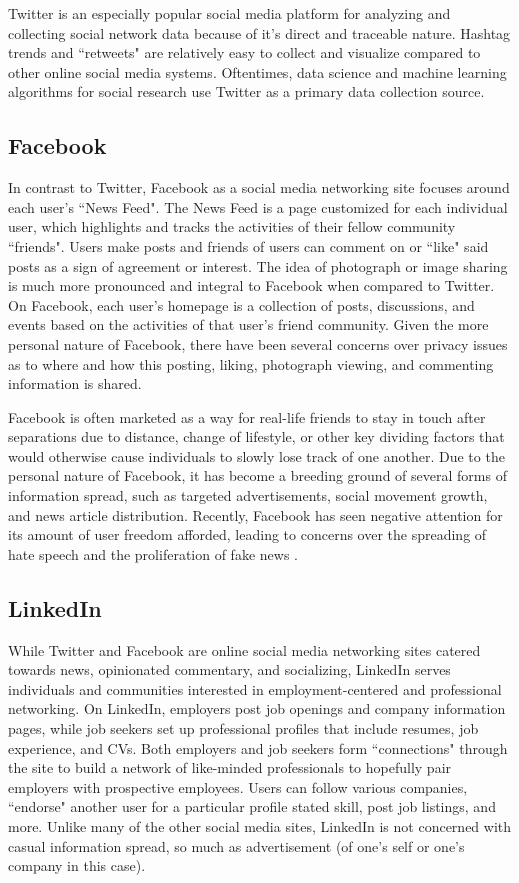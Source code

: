 Twitter is an especially popular social media platform for analyzing and collecting social network data because of it's direct and traceable nature. Hashtag trends and ``retweets" are relatively easy to collect and visualize compared to other online social media systems. Oftentimes, data science and machine learning algorithms for social research use Twitter as a primary data collection source.

\subsection{Facebook}
In contrast to Twitter, Facebook as a social media networking site focuses around each user's ``News Feed". The News Feed is a page customized for each individual user, which highlights and tracks the activities of their fellow community ``friends". Users make posts and friends of users can comment on or ``like" said posts as a sign of agreement or interest. The idea of photograph or image sharing is much more pronounced and integral to Facebook when compared to Twitter. On Facebook, each user's homepage is a collection of posts, discussions, and events based on the activities of that user's friend community. Given the more personal nature of Facebook, there have been several concerns over privacy issues as to where and how this posting, liking, photograph viewing, and commenting information is shared.

Facebook is often marketed as a way for real-life friends to stay in touch after separations due to distance, change of lifestyle, or other key dividing factors that would otherwise cause individuals to slowly lose track of one another. Due to the personal nature of Facebook, it has become a breeding ground of several forms of information spread, such as targeted advertisements, social movement growth, and news article distribution. Recently, Facebook has seen negative attention for its amount of user freedom afforded, leading to concerns over the spreading of hate speech and the proliferation of fake news \cite{facebookcrisis2016}. 

\subsection{LinkedIn}
While Twitter and Facebook are online social media networking sites catered towards news, opinionated commentary, and socializing, LinkedIn serves individuals and communities interested in employment-centered and professional networking. On LinkedIn, employers post job openings and company information pages, while job seekers set up professional profiles that include resumes, job experience, and CVs. Both employers and job seekers form ``connections" through the site to build a network of like-minded professionals to hopefully pair employers with prospective employees. Users can follow various companies, ``endorse" another user for a particular profile stated skill, post job listings, and more. Unlike many of the other social media sites, LinkedIn is not concerned with casual information spread, so much as advertisement (of one's self or one's company in this case).

